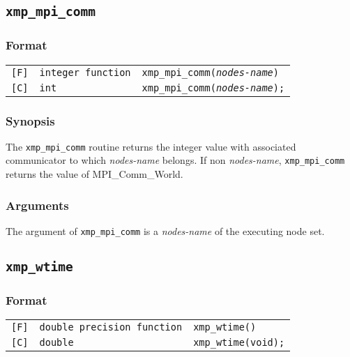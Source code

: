 \vspace{0.3cm}

\subsection{\tt xmp\_mpi\_comm}

\subsubsection*{Format}

\begin{tabular}{lll}

\verb![F]!&  {\tt integer function}& {\tt xmp\_mpi\_comm({\it nodes-name})}\\

\verb![C]!&  {\tt int}& {\tt xmp\_mpi\_comm({\it nodes-name});}

\end{tabular}

\subsubsection*{Synopsis}
     The {\tt xmp\_mpi\_comm} routine returns the integer value with associated communicator
     to which {\it nodes-name} belongs. If non {\it nodes-name}, {\tt xmp\_mpi\_comm} returns 
     the value of MPI\_Comm\_World.

\subsubsection*{Arguments}
    The argument of {\tt xmp\_mpi\_comm} is a {\it nodes-name} of the executing node set.


\vspace{0.3cm}

\subsection{\tt xmp\_wtime}

\subsubsection*{Format}

\begin{tabular}{lll}

\verb![F]!&  {\tt double precision function}& {\tt xmp\_wtime()}\\

\verb![C]!&  {\tt double}& {\tt xmp\_wtime(void);}

\end{tabular}

